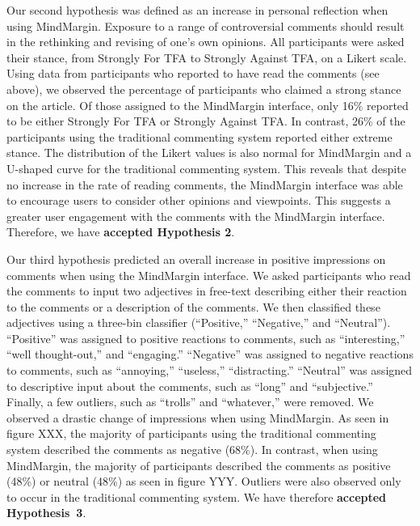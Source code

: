 Our second hypothesis was defined as an increase in personal reflection when using MindMargin. Exposure to a range of controversial comments should result in the rethinking and revising of one’s own opinions. All participants were asked their stance, from Strongly For TFA to Strongly Against TFA, on a Likert scale. Using data from participants who reported to have read the comments (see above), we observed the percentage of participants who claimed a strong stance on the article. Of those assigned to the MindMargin interface, only 16\% reported to be either Strongly For TFA or Strongly Against TFA. In contrast, 26\% of the participants using the traditional commenting system reported either extreme stance. The distribution of the Likert values is also normal for MindMargin and a U-shaped curve for the traditional commenting system. This reveals that despite no increase in the rate of reading comments, the MindMargin interface was able to encourage users to consider other opinions and viewpoints. This suggests a greater user engagement with the comments with the MindMargin interface. Therefore, we have \textbf{accepted Hypothesis 2}.

Our third hypothesis predicted an overall increase in positive impressions on comments when using the MindMargin interface. We asked participants who read the comments to input two adjectives in free-text describing either their reaction to the comments or a description of the comments. We then classified these adjectives using a three-bin classifier (“Positive,” “Negative,” and “Neutral”). “Positive” was assigned to positive reactions to comments, such as “interesting,” “well thought-out,” and “engaging.” “Negative” was assigned to negative reactions to comments, such as “annoying,” “useless,” “distracting.” “Neutral” was assigned to descriptive input about the comments, such as “long” and “subjective.” Finally, a few outliers, such as “trolls” and “whatever,” were removed. We observed a drastic change of impressions when using MindMargin. As seen in figure XXX, the majority of participants using the traditional commenting system described the comments as negative (68\%). In contrast, when using MindMargin, the majority of participants described the comments as positive (48\%) or neutral (48\%) as seen in figure YYY.  Outliers were also observed only to occur in the traditional commenting system. We have therefore \textbf{accepted Hypothesis~3}. 

